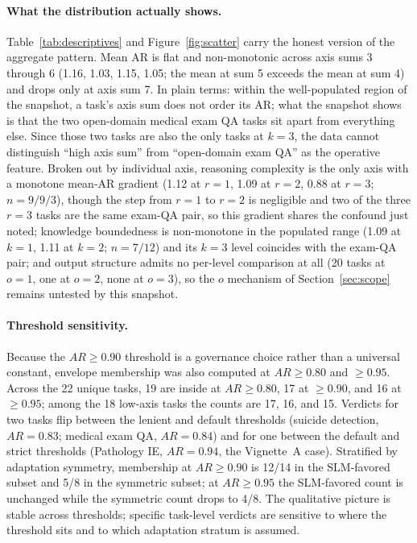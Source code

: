 \documentclass[11pt]{article}
\begin{document}
\paragraph{What the distribution actually shows.}
Table~\ref{tab:descriptives} and Figure~\ref{fig:scatter} carry the honest version of the aggregate pattern. Mean AR is flat and non-monotonic across axis sums 3 through 6 (1.16, 1.03, 1.15, 1.05; the mean at sum 5 exceeds the mean at sum 4) and drops only at axis sum 7. In plain terms: within the well-populated region of the snapshot, a task's axis sum does not order its AR; what the snapshot shows is that the two open-domain medical exam QA tasks sit apart from everything else. Since those two tasks are also the only tasks at $k=3$, the data cannot distinguish ``high axis sum'' from ``open-domain exam QA'' as the operative feature. Broken out by individual axis, reasoning complexity is the only axis with a monotone mean-AR gradient (1.12 at $r=1$, 1.09 at $r=2$, 0.88 at $r=3$; $n = 9/9/3$), though the step from $r=1$ to $r=2$ is negligible and two of the three $r=3$ tasks are the same exam-QA pair, so this gradient shares the confound just noted; knowledge boundedness is non-monotone in the populated range (1.09 at $k=1$, 1.11 at $k=2$; $n = 7/12$) and its $k=3$ level coincides with the exam-QA pair; and output structure admits no per-level comparison at all (20 tasks at $o=1$, one at $o=2$, none at $o=3$), so the $o$ mechanism of Section~\ref{sec:scope} remains untested by this snapshot.

\paragraph{Threshold sensitivity.}
Because the $AR \geq 0.90$ threshold is a governance choice rather than a universal constant, envelope membership was also computed at $AR \geq 0.80$ and $\geq 0.95$. Across the 22 unique tasks, 19 are inside at $AR \geq 0.80$, 17 at $\geq 0.90$, and 16 at $\geq 0.95$; among the 18 low-axis tasks the counts are 17, 16, and 15. Verdicts for two tasks flip between the lenient and default thresholds (suicide detection, $AR = 0.83$; medical exam QA, $AR = 0.84$) and for one between the default and strict thresholds (Pathology IE, $AR = 0.94$, the Vignette~A case). Stratified by adaptation symmetry, membership at $AR \geq 0.90$ is 12/14 in the SLM-favored subset and 5/8 in the symmetric subset; at $AR \geq 0.95$ the SLM-favored count is unchanged while the symmetric count drops to 4/8. The qualitative picture is stable across thresholds; specific task-level verdicts are sensitive to where the threshold sits and to which adaptation stratum is assumed.
\end{document}
